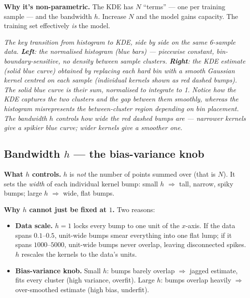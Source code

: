 \documentclass[11pt, a4paper]{article}
\begin{document}
\textbf{Why it's non-parametric.} The KDE has $N$ ``terms'' — one per training sample — and the bandwidth $h$. Increase $N$ and the model gains capacity. The training set effectively \emph{is} the model.

\begin{center}

\footnotesize\textit{The key transition from histogram to KDE, side by side on the same 6-sample data. \textbf{Left}: the normalised histogram (blue bars) --- piecewise constant, bin-boundary-sensitive, no density between sample clusters. \textbf{Right}: the KDE estimate (solid blue curve) obtained by replacing each hard bin with a smooth Gaussian kernel centred on each sample (individual kernels shown as red dashed bumps). The solid blue curve is their sum, normalised to integrate to 1. Notice how the KDE captures the two clusters and the gap between them smoothly, whereas the histogram misrepresents the between-cluster region depending on bin placement. The bandwidth $h$ controls how wide the red dashed bumps are --- narrower kernels give a spikier blue curve; wider kernels give a smoother one.}
\end{center}

\subsection{Bandwidth $h$ — the bias-variance knob}

\textbf{What $h$ controls.} $h$ is \emph{not} the number of points summed over (that is $N$). It sets the \emph{width} of each individual kernel bump: small $h$ $\Rightarrow$ tall, narrow, spiky bumps; large $h$ $\Rightarrow$ wide, flat bumps.

\textbf{Why $h$ cannot just be fixed at $1$.} Two reasons:
\begin{itemize}
  \item \textbf{Data scale.} $h=1$ locks every bump to one unit of the $x$-axis. If the data spans $0.1$--$0.5$, unit-wide bumps smear everything into one flat lump; if it spans $1000$--$5000$, unit-wide bumps never overlap, leaving disconnected spikes. $h$ rescales the kernels to the data's units.
  \item \textbf{Bias-variance knob.} Small $h$: bumps barely overlap $\Rightarrow$ jagged estimate, fits every cluster (high variance, overfit). Large $h$: bumps overlap heavily $\Rightarrow$ over-smoothed estimate (high bias, underfit).
\end{itemize}
\end{document}
